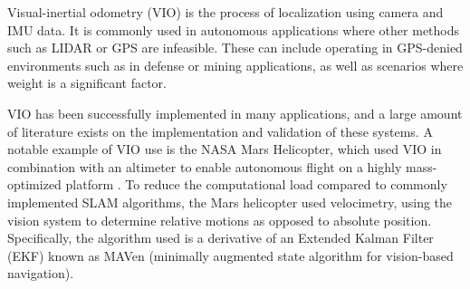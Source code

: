 \documentclass[bare_jrnl_transmag]{subfiles}
\begin{document}
Visual-inertial odometry (VIO) is the process of localization using camera and IMU data. It is commonly used in autonomous applications where other methods such as LIDAR or GPS are infeasible. These can include operating in GPS-denied environments such as in defense or mining applications, as well as scenarios where weight is a significant factor. \newline

VIO has been successfully implemented in many applications, and a large amount of literature exists on the implementation and validation of these systems. A notable example of VIO use is the NASA Mars Helicopter, which used VIO in combination with an altimeter to enable autonomous flight on a highly mass-optimized platform \cite{mars_paper}. To reduce the computational load compared to commonly implemented SLAM algorithms, the Mars helicopter used velocimetry, using the vision system to determine relative motions as opposed to absolute position. Specifically, the algorithm used is a derivative of an Extended Kalman Filter (EKF) known as MAVen (minimally augmented state algorithm for vision-based navigation). 
\end{document}
